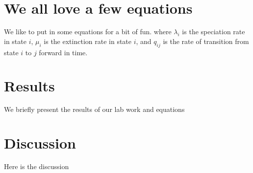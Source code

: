 \section{We all love a few equations}
We like to put in some equations for a bit of fun.
where $\lambda_i$ is the speciation rate in state $i$, $\mu_i$ is the
extinction rate in state $i$, and $q_{ij}$ is the rate of transition
from state $i$ to $j$ forward in time.

\section{Results}
We briefly present the results of our lab work and equations


\section{Discussion}

Here is the discussion

